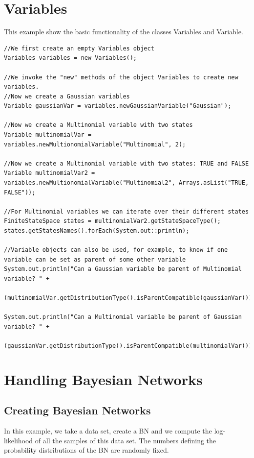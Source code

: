 \section{Variables}


This example show the basic functionality of the classes Variables and Variable.

\begin{lstlisting}
//We first create an empty Variables object
Variables variables = new Variables();

//We invoke the "new" methods of the object Variables to create new variables.
//Now we create a Gaussian variables
Variable gaussianVar = variables.newGaussianVariable("Gaussian");

//Now we create a Multinomial variable with two states
Variable multinomialVar = variables.newMultionomialVariable("Multinomial", 2);

//Now we create a Multinomial variable with two states: TRUE and FALSE
Variable multinomialVar2 = variables.newMultionomialVariable("Multinomial2", Arrays.asList("TRUE, FALSE"));

//For Multinomial variables we can iterate over their different states
FiniteStateSpace states = multinomialVar2.getStateSpaceType();
states.getStatesNames().forEach(System.out::println);

//Variable objects can also be used, for example, to know if one variable can be set as parent of some other variable
System.out.println("Can a Gaussian variable be parent of Multinomial variable? " +
        (multinomialVar.getDistributionType().isParentCompatible(gaussianVar)));

System.out.println("Can a Multinomial variable be parent of Gaussian variable? " +
        (gaussianVar.getDistributionType().isParentCompatible(multinomialVar)));
\end{lstlisting}



\section{Handling Bayesian Networks}


\subsection{Creating Bayesian Networks }

In this example, we take a data set, create a BN and we compute the log-likelihood of all the samples
of this data set. The numbers defining the probability distributions of the BN are randomly fixed.

